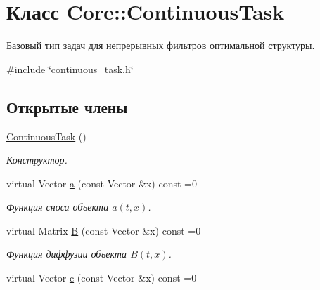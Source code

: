 \hypertarget{class_core_1_1_continuous_task}{}\section{Класс Core\+:\+:Continuous\+Task}
\label{class_core_1_1_continuous_task}


Базовый тип задач для непрерывных фильтров оптимальной структуры.  




{\ttfamily \#include \char`\"{}continuous\+\_\+task.\+h\char`\"{}}

\subsection*{Открытые члены}
\begin{DoxyCompactItemize}
\item 
\hyperlink{class_core_1_1_continuous_task_ab2c8106695e42db14d92364d1a310a6a}{Continuous\+Task} ()\hypertarget{class_core_1_1_continuous_task_ab2c8106695e42db14d92364d1a310a6a}{}\label{class_core_1_1_continuous_task_ab2c8106695e42db14d92364d1a310a6a}

\begin{DoxyCompactList}\small\item\em Конструктор. \end{DoxyCompactList}\item 
virtual Vector \hyperlink{class_core_1_1_continuous_task_a6117abb702d06b52eec1dc1951bab874}{a} (const Vector \&x) const =0\hypertarget{class_core_1_1_continuous_task_a6117abb702d06b52eec1dc1951bab874}{}\label{class_core_1_1_continuous_task_a6117abb702d06b52eec1dc1951bab874}

\begin{DoxyCompactList}\small\item\em Функция сноса объекта $a(t,x)$. \end{DoxyCompactList}\item 
virtual Matrix \hyperlink{class_core_1_1_continuous_task_a1a1af322efd852451692b7a2e39ec19e}{B} (const Vector \&x) const =0\hypertarget{class_core_1_1_continuous_task_a1a1af322efd852451692b7a2e39ec19e}{}\label{class_core_1_1_continuous_task_a1a1af322efd852451692b7a2e39ec19e}

\begin{DoxyCompactList}\small\item\em Функция диффузии объекта $B(t,x)$. \end{DoxyCompactList}\item 
virtual Vector \hyperlink{class_core_1_1_continuous_task_a623929970ce6d99f97b83b940003d004}{c} (const Vector \&x) const =0\hypertarget{class_core_1_1_continuous_task_a623929970ce6d99f97b83b940003d004}{}\label{class_core_1_1_continuous_task_a623929970ce6d99f97b83b940003d004}


\end{DoxyCompactItemize}
